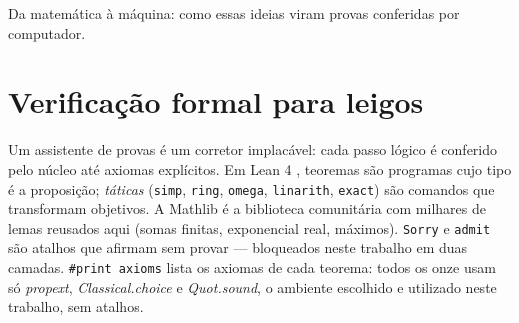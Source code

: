 Da matemática à máquina: como essas ideias viram provas conferidas por computador.
\section{Verificação formal para leigos}
Um assistente de provas é um corretor implacável: cada passo lógico é conferido pelo núcleo até axiomas explícitos. Em Lean 4 \cite{moura2021}, teoremas são programas cujo tipo é a proposição; \textit{táticas} (\texttt{simp}, \texttt{ring}, \texttt{omega}, \texttt{linarith}, \texttt{exact}) são comandos que transformam objetivos. A Mathlib \cite{mathlib2020} é a biblioteca comunitária com milhares de lemas reusados aqui (somas finitas, exponencial real, máximos). \texttt{Sorry} e \texttt{admit} são atalhos que afirmam sem provar --- bloqueados neste trabalho em duas camadas. \texttt{\#print axioms} lista os axiomas de cada teorema: todos os onze usam só \textit{propext}, \textit{Classical.choice} e \textit{Quot.sound}, o ambiente escolhido e utilizado neste trabalho, sem atalhos.
